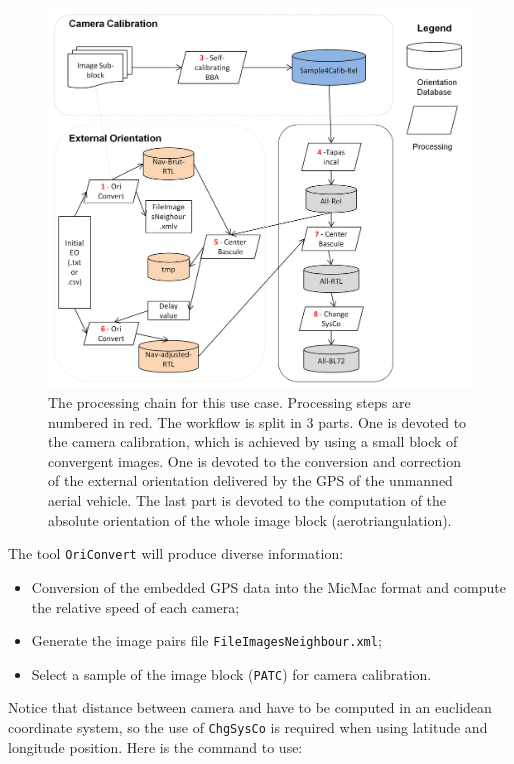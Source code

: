 \begin{figure}[H]
\centering
\includegraphics[width=0.9\linewidth]{FIGS/UASGrandLeez/workflow_UASGL.png}
\caption{The processing chain for this use case. Processing steps are numbered in red. The workflow is split in 3 parts. One is devoted to the camera calibration, which is achieved by using a small block of convergent images. One is devoted to the conversion and correction of the  external orientation delivered by the GPS of the unmanned aerial vehicle. The last part is devoted to the computation of the absolute orientation of the whole image block (aerotriangulation). }
\label{FIG:workflowGL}
\end{figure}

\vspace{\baselineskip}
The tool { \tt OriConvert} will produce diverse information: 
\begin{itemize}
\item Conversion of the embedded GPS data into the MicMac format and compute the relative speed of each camera;
\item Generate the image pairs file {\tt FileImagesNeighbour.xml};
\item Select a sample of the image block ({\tt PATC}) for camera calibration.
\end{itemize}
\vspace{\baselineskip}
Notice that distance between camera and have to be computed in an euclidean coordinate system, so the use of {\tt ChgSysCo} is required when using latitude and longitude position. Here is the command to use:

